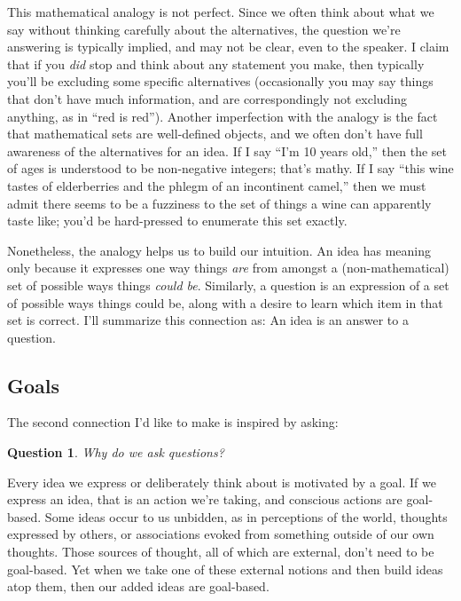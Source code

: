 \documentclass[11pt, oneside]{article}   	%
\newenvironment{answer}[1]
  {\renewcommand\theinnercustomthm{#1}\innercustomthm}
  {\endinnercustomthm}
\newtheorem{question}{Question}
\begin{document}
This mathematical analogy is not perfect.
Since we often think about what we say without thinking carefully about the
alternatives, the question we're answering
is typically implied, and may not be clear, even to
the speaker. I claim that if you {\em did} stop and think about any statement
you
make, then typically you'll be excluding some specific alternatives
(occasionally you may say things that don't have much information, and are
correspondingly not excluding anything, as in ``red is red'').
Another imperfection with the analogy is the fact that mathematical
sets are well-defined objects, and we often don't have full awareness of the
alternatives for an idea.
If I say ``I'm 10 years old,'' then the set of ages is understood
to be non-negative integers; that's mathy. If I say ``this wine tastes of
elderberries and the phlegm of an incontinent camel,'' then we must admit there
seems to be a fuzziness to the set of things a wine can apparently taste like;
you'd be hard-pressed to enumerate this set exactly.

Nonetheless, the analogy helps us to build our intuition.
An idea has meaning only because it expresses one way things
{\em are} from amongst a
(non-mathematical) set of possible ways things {\em could be}.
Similarly, a question is an expression of a set of possible ways things could
be, along with a desire to learn which item in that set is correct.
I'll summarize this
connection as:
\begin{answer}{4}
    An idea is an answer to a question.
\end{answer}

\subsection{Goals}

The second connection I'd like to make is inspired by asking:
\begin{question}
    Why do we ask questions?
\end{question}

Every idea we express or deliberately think about is motivated by a goal.
If we express an idea, that is an action we're taking,
and conscious actions are
goal-based.
Some ideas occur to us unbidden, as in perceptions of the world,
thoughts expressed by others, or associations evoked from something outside of
our own thoughts.
Those sources of thought, all of which are external, don't need to be
goal-based.
Yet when we take one of these external notions and then build
ideas atop them, then our added ideas are goal-based.
\end{document}
